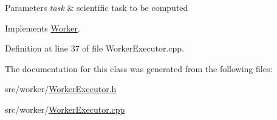 \begin{DoxyParams}{Parameters}
{\em task} & scientific task to be computed \\
\hline
\end{DoxyParams}


Implements \hyperlink{class_worker_a78d4ec19f0ec658782263b3f64001f39}{Worker}.



Definition at line 37 of file Worker\+Executor.\+cpp.



The documentation for this class was generated from the following files\+:\begin{DoxyCompactItemize}
\item 
src/worker/\hyperlink{_worker_executor_8h}{Worker\+Executor.\+h}\item 
src/worker/\hyperlink{_worker_executor_8cpp}{Worker\+Executor.\+cpp}\end{DoxyCompactItemize}
